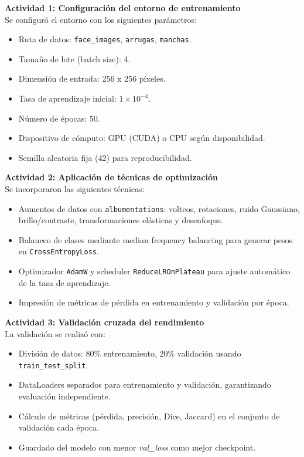 \textbf{Actividad 1: Configuración del entorno de entrenamiento}\\
Se configuró el entorno con los siguientes parámetros:
\begin{itemize}
  \item Ruta de datos: \texttt{face\_images}, \texttt{arrugas}, \texttt{manchas}.  
  \item Tamaño de lote (batch size): 4.  
  \item Dimensión de entrada: 256 x 256 píxeles.  
  \item Tasa de aprendizaje inicial: $1\times10^{-4}$.  
  \item Número de épocas: 50.  
  \item Dispositivo de cómputo: GPU (CUDA) o CPU según disponibilidad.  
  \item Semilla aleatoria fija (42) para reproducibilidad.  
\end{itemize}

\textbf{Actividad 2: Aplicación de técnicas de optimización}\\
Se incorporaron las siguientes técnicas:
\begin{itemize}
  \item Aumentos de datos con \texttt{albumentations}: volteos, rotaciones, ruido Gaussiano, brillo/contraste, transformaciones elásticas y desenfoque.  
  \item Balanceo de clases mediante median frequency balancing para generar pesos en \texttt{CrossEntropyLoss}.  
  \item Optimizador \texttt{AdamW} y scheduler \texttt{ReduceLROnPlateau} para ajuste automático de la tasa de aprendizaje.  
  \item Impresión de métricas de pérdida en entrenamiento y validación por época.  
\end{itemize}

\textbf{Actividad 3: Validación cruzada del rendimiento}\\
La validación se realizó con:
\begin{itemize}
  \item División de datos: 80\% entrenamiento, 20\% validación usando \texttt{train\_test\_split}.  
  \item DataLoaders separados para entrenamiento y validación, garantizando evaluación independiente.  
  \item Cálculo de métricas (pérdida, precisión, Dice, Jaccard) en el conjunto de validación cada época.  
  \item Guardado del modelo con menor \emph{val\_loss} como mejor checkpoint.  
\end{itemize}


